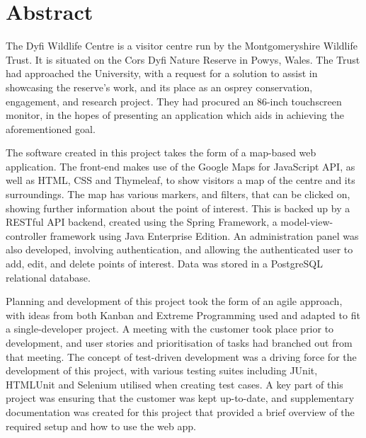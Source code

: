 \thispagestyle{empty}


\section*{\centering Abstract}

The Dyfi Wildlife Centre is a visitor centre run by the Montgomeryshire Wildlife Trust. It is situated on the Cors Dyfi Nature Reserve in Powys, Wales. The Trust had approached the University, with a request for a solution to assist in showcasing the reserve's work, and its place as an osprey conservation, engagement, and research project. They had procured an 86-inch touchscreen monitor, in the hopes of presenting an application which aids in achieving the aforementioned goal.

The software created in this project takes the form of a map-based web application. The front-end makes use of the Google Maps for JavaScript API, as well as HTML, CSS and Thymeleaf, to show visitors a map of the centre and its surroundings. The map has various markers, and filters, that can be clicked on, showing further information about the point of interest. This is backed up by a RESTful API backend, created using the Spring Framework, a model-view-controller framework using Java Enterprise Edition. An administration panel was also developed, involving authentication, and allowing the authenticated user to add, edit, and delete points of interest. Data was stored in a PostgreSQL relational database.

Planning and development of this project took the form of an agile approach, with ideas from both Kanban and Extreme Programming used and adapted to fit a single-developer project. A meeting with the customer took place prior to development, and user stories and prioritisation of tasks had branched out from that meeting. The concept of test-driven development was a driving force for the development of this project, with various testing suites including JUnit, HTMLUnit and Selenium utilised when creating test cases. A key part of this project was ensuring that the customer was kept up-to-date, and supplementary documentation was created for this project that provided a brief overview of the required setup and how to use the web app.



